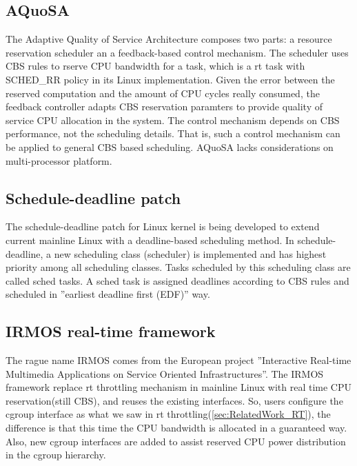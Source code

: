\subsection{AQuoSA\label{sec:AQuoSA}}
The Adaptive Quality of Service Architecture composes two parts: 
a resource reservation scheduler an a feedback-based
control mechanism. The scheduler uses CBS rules to rserve CPU bandwidth for
a task, which is a rt task with SCHED\_RR policy in its Linux implementation.
Given the error between the reserved computation and the amount of CPU cycles
really consumed, the feedback controller adapts CBS reservation paramters to
provide quality of service CPU allocation in the system.
The control mechanism depends on CBS performance, not the scheduling details.
That is, such a control mechanism can be applied to general CBS based 
scheduling. AQuoSA lacks considerations on multi-processor platform.
  
\subsection{Schedule-deadline patch}
The schedule-deadline patch for Linux kernel is being developed to extend
current mainline Linux with a deadline-based scheduling method. 
In schedule-deadline, a new scheduling class (scheduler) is implemented and 
has highest priority among all scheduling classes. Tasks scheduled by this
scheduling class are called sched tasks. A sched task is assigned deadlines
according to CBS rules and scheduled in ''earliest deadline first (EDF)'' way.
\subsection{IRMOS real-time framework}
The rague name IRMOS comes from the European project ''Interactive Real-time
Multimedia Applications on Service Oriented Infrastructures''. 
The IRMOS 
framework replace rt throttling mechanism in mainline Linux with real time
CPU reservation(still CBS), and reuses the existing interfaces. So, users 
configure the cgroup interface as what we saw in rt 
throttling(\ref{sec:RelatedWork_RT}), the difference is that this time the CPU 
bandwidth is allocated in a guaranteed way. Also, new cgroup interfaces are 
added to assist reserved CPU power distribution in the cgroup hierarchy.
